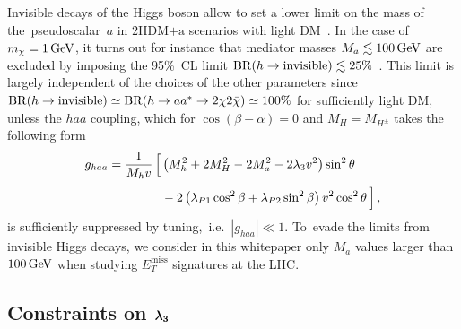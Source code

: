 \documentclass[a4paper, 11pt,notoc]{article}
\newcommand{\MET}{\ensuremath{E_T^\mathrm{miss}}\xspace}
\newcommand{\hdma}{\ensuremath{\textrm{2HDM+a}}\xspace}
\def\bm#1{\mbox{\boldmath$#1$\unboldmath}}
\begin{document}
Invisible decays of the Higgs boson allow to set a lower limit on the mass of  the~pseudoscalar~$a$ in \hdma scenarios with light DM~\cite{Bauer:2017ota}. In the case of $m_\chi = 1 \, {\rm GeV}$, it turns out for instance that mediator masses $M_a \lesssim 100 \, {\rm GeV}$ are excluded by imposing the 95\%~CL limit ${\rm BR} (h \to  \text{invisible}) \lesssim 25\%$~\cite{Aad:2015pla,Khachatryan:2016whc}.  This limit is largely independent of the choices of the other parameters since ${\rm BR} (h \to  \text{invisible}) \simeq {\rm BR} (h \to a a^\ast \to 2 \chi 2 \bar \chi) \simeq 100\%$ for sufficiently light DM, unless  the $haa$ coupling, which for $\cos (\beta-\alpha) = 0$ and $M_H = M_{H^\pm}$ takes the following form~\cite{Bauer:2017ota}
\begin{equation}
\begin{split}
g_{haa} & = \frac{1}{M_h v}  \, \Big [ \left ( M_h^2  + 2 M_H^2  -  2 M_a^2 - 2 \lambda_3 v^2 \right) \sin^2 \theta \\[1mm] &  \hspace{1.5cm} - 2 \left (  \lambda_{P1} \cos^2 \beta + \lambda_{P2} \sin^2 \beta  \right ) v^2 \cos^2 \theta \, \Big ]  \,, 
\end{split}
\end{equation}
is sufficiently suppressed by tuning,~i.e.~$|g_{haa}| \ll 1$. To~evade the limits from invisible Higgs decays, we consider in this whitepaper only $M_a$ values larger than $100 \, {\rm GeV}$ when studying $\MET$ signatures at the LHC. 

\subsection{Constraints on $\bm{\lambda_3}$}
\end{document}

